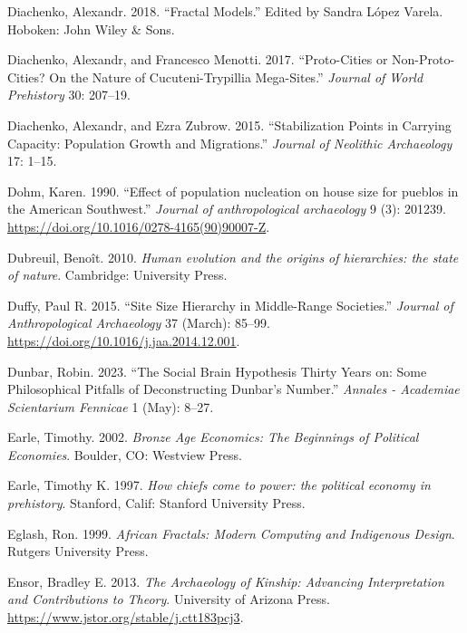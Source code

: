 \documentclass[
  12pt,
  a4paper, twoside]{book}
\newlength{\cslhangindent}
\newlength{\cslentryspacingunit} %
\newenvironment{CSLReferences}[2] %
 {%
  \setlength{\parindent}{0pt}
  \ifodd #1
  \let\oldpar\par
  \def\par{\hangindent=\cslhangindent\oldpar}
  \fi
  \setlength{\parskip}{#2\cslentryspacingunit}
 }%
 {}
\begin{document}
\begin{CSLReferences}{1}{0}
\leavevmode{}%
Diachenko, Alexandr. 2018. {``Fractal Models.''} Edited by Sandra López Varela. Hoboken: John Wiley \& Sons.

\leavevmode{}%
Diachenko, Alexandr, and Francesco Menotti. 2017. {``Proto-Cities or Non-Proto-Cities? On the Nature of Cucuteni-Trypillia Mega-Sites.''} \emph{Journal of World Prehistory} 30: 207--19.

\leavevmode{}%
Diachenko, Alexandr, and Ezra Zubrow. 2015. {``Stabilization Points in Carrying Capacity: Population Growth and Migrations.''} \emph{Journal of Neolithic Archaeology} 17: 1--15.

\leavevmode{}%
Dohm, Karen. 1990. {``Effect of population nucleation on house size for pueblos in the American Southwest.''} \emph{Journal of anthropological archaeology} 9 (3): 201239. \url{https://doi.org/10.1016/0278-4165(90)90007-Z}.

\leavevmode{}%
Dubreuil, Benoît. 2010. \emph{Human evolution and the origins of hierarchies: the state of nature}. Cambridge: University Press.

\leavevmode{}%
Duffy, Paul R. 2015. {``Site Size Hierarchy in Middle-Range Societies.''} \emph{Journal of Anthropological Archaeology} 37 (March): 85--99. \url{https://doi.org/10.1016/j.jaa.2014.12.001}.

\leavevmode{}%
Dunbar, Robin. 2023. {``The Social Brain Hypothesis Thirty Years on: Some Philosophical Pitfalls of Deconstructing Dunbar's Number.''} \emph{Annales - Academiae Scientarium Fennicae} 1 (May): 8--27.

\leavevmode{}%
Earle, Timothy. 2002. \emph{Bronze Age Economics: The Beginnings of Political Economies}. Boulder, CO: Westview Press.

\leavevmode{}%
Earle, Timothy K. 1997. \emph{How chiefs come to power: the political economy in prehistory}. Stanford, Calif: Stanford University Press.

\leavevmode{}%
Eglash, Ron. 1999. \emph{African Fractals: Modern Computing and Indigenous Design}. Rutgers University Press.

\leavevmode{}%
Ensor, Bradley E. 2013. \emph{The Archaeology of Kinship: Advancing Interpretation and Contributions to Theory}. University of Arizona Press. \url{https://www.jstor.org/stable/j.ctt183pcj3}.


\end{CSLReferences}
\end{document}
